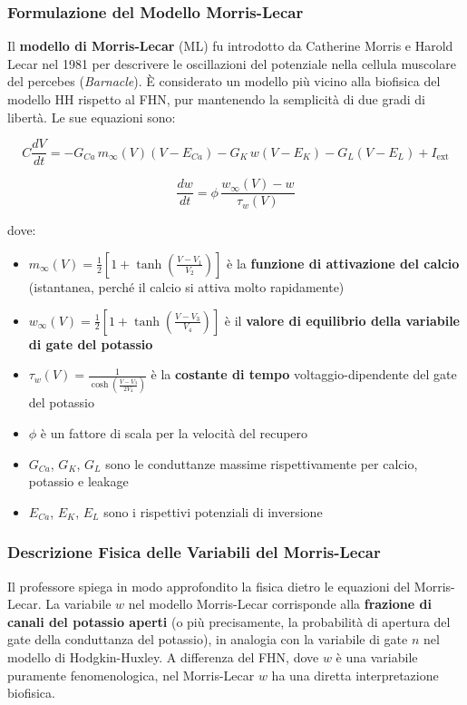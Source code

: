 \subsubsection{Formulazione del Modello Morris-Lecar}

Il \textbf{modello di Morris-Lecar} (ML) fu introdotto da Catherine Morris e Harold Lecar nel 1981 per descrivere le oscillazioni del potenziale nella cellula muscolare del percebes (\textit{Barnacle}). È considerato un modello più vicino alla biofisica del modello HH rispetto al FHN, pur mantenendo la semplicità di due gradi di libertà. Le sue equazioni sono:

\begin{equation}
C \frac{dV}{dt} = -G_{Ca} \, m_\infty(V)(V - E_{Ca}) - G_K \, w(V - E_K) - G_L(V - E_L) + I_{\text{ext}}
\end{equation}

\begin{equation}
\frac{dw}{dt} = \phi \, \frac{w_\infty(V) - w}{\tau_w(V)}
\end{equation}

dove:
\begin{itemize}
    \item $m_\infty(V) = \frac{1}{2}\left[1 + \tanh\!\left(\frac{V - V_1}{V_2}\right)\right]$ è la \textbf{funzione di attivazione del calcio} (istantanea, perché il calcio si attiva molto rapidamente)
    \item $w_\infty(V) = \frac{1}{2}\left[1 + \tanh\!\left(\frac{V - V_3}{V_4}\right)\right]$ è il \textbf{valore di equilibrio della variabile di gate del potassio}
    \item $\tau_w(V) = \frac{1}{\cosh\!\left(\frac{V - V_3}{2V_4}\right)}$ è la \textbf{costante di tempo} voltaggio-dipendente del gate del potassio
    \item $\phi$ è un fattore di scala per la velocità del recupero
    \item $G_{Ca}$, $G_K$, $G_L$ sono le conduttanze massime rispettivamente per calcio, potassio e leakage
    \item $E_{Ca}$, $E_K$, $E_L$ sono i rispettivi potenziali di inversione
\end{itemize}

\subsubsection{Descrizione Fisica delle Variabili del Morris-Lecar}

Il professore spiega in modo approfondito la fisica dietro le equazioni del Morris-Lecar. La variabile $w$ nel modello Morris-Lecar corrisponde alla \textbf{frazione di canali del potassio aperti} (o più precisamente, la probabilità di apertura del gate della conduttanza del potassio), in analogia con la variabile di gate $n$ nel modello di Hodgkin-Huxley. A differenza del FHN, dove $w$ è una variabile puramente fenomenologica, nel Morris-Lecar $w$ ha una diretta interpretazione biofisica.

